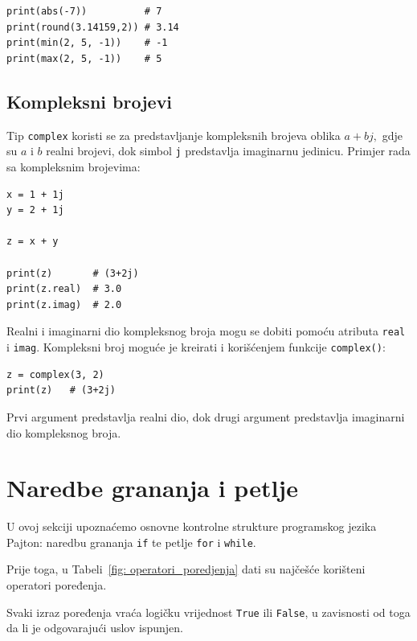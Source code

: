 \begin{example}
	\begin{verbatim}
		
		
print(abs(-7))          # 7
print(round(3.14159,2)) # 3.14
print(min(2, 5, -1))    # -1
print(max(2, 5, -1))    # 5
\end{verbatim}
\end{example}

\subsection{Kompleksni brojevi}

Tip \texttt{complex} koristi se za predstavljanje kompleksnih brojeva oblika  $a+bj,$ gdje su $a$ i $b$ realni brojevi, dok simbol \texttt{j} predstavlja imaginarnu jedinicu.  Primjer rada sa kompleksnim brojevima:

\begin{verbatim}
x = 1 + 1j
y = 2 + 1j

z = x + y

print(z)       # (3+2j)
print(z.real)  # 3.0
print(z.imag)  # 2.0
\end{verbatim}

Realni i imaginarni dio kompleksnog broja mogu se dobiti pomoću atributa \texttt{real} i \texttt{imag}.  Kompleksni broj moguće je kreirati i korišćenjem funkcije \texttt{complex()}:

\begin{verbatim}
z = complex(3, 2)
print(z)   # (3+2j)
\end{verbatim}

Prvi argument predstavlja realni dio, dok drugi argument predstavlja imaginarni dio kompleksnog broja.

\section{Naredbe grananja i petlje}

U ovoj sekciji upoznaćemo osnovne kontrolne strukture programskog jezika Pajton: naredbu grananja \texttt{if} te petlje \texttt{for} i \texttt{while}.

Prije toga, u Tabeli~\ref{fig: operatori_poredjenja} dati su najčešće korišteni operatori poređenja.

Svaki izraz poređenja vraća logičku vrijednost \texttt{True} ili \texttt{False}, u zavisnosti od toga da li je odgovarajući uslov ispunjen.


